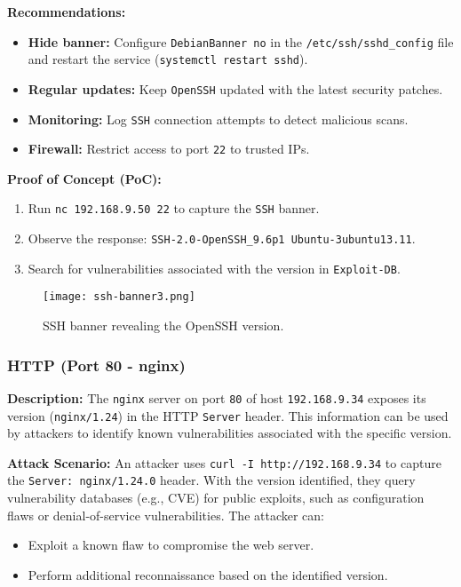\documentclass[a4paper,12pt]{article}
\begin{document}
\textbf{Recommendations:}  
\begin{itemize}
    \item \textbf{Hide banner:} Configure \texttt{DebianBanner no} in the \texttt{/etc/ssh/sshd\_config} file and restart the service (\texttt{systemctl restart sshd}).  
    \item \textbf{Regular updates:} Keep \texttt{OpenSSH} updated with the latest security patches.  
    \item \textbf{Monitoring:} Log \texttt{SSH} connection attempts to detect malicious scans.  
    \item \textbf{Firewall:} Restrict access to port \texttt{22} to trusted IPs.  
\end{itemize}

\textbf{Proof of Concept (PoC):}  
\begin{enumerate}
    \item Run \texttt{nc 192.168.9.50 22} to capture the \texttt{SSH} banner.  
    \item Observe the response: \texttt{SSH-2.0-OpenSSH\_9.6p1 Ubuntu-3ubuntu13.11}.  
    \item Search for vulnerabilities associated with the version in \texttt{Exploit-DB}.  
\end{enumerate}

\begin{figure}[ht]
    \centering
    \texttt{[image: ssh-banner3.png]}
    \caption{SSH banner revealing the OpenSSH version.}
\end{figure}

\subsubsection{HTTP (Port 80 - nginx)}
\textbf{Description:}  
The \texttt{nginx} server on port \texttt{80} of host \texttt{192.168.9.34} exposes its version (\texttt{nginx/1.24}) in the HTTP \texttt{Server} header. This information can be used by attackers to identify known vulnerabilities associated with the specific version.

\textbf{Attack Scenario:}  
An attacker uses \texttt{curl -I http://192.168.9.34} to capture the \texttt{Server: nginx/1.24.0} header. With the version identified, they query vulnerability databases (e.g., CVE) for public exploits, such as configuration flaws or denial-of-service vulnerabilities. The attacker can:  
\begin{itemize}
    \item Exploit a known flaw to compromise the web server.  
    \item Perform additional reconnaissance based on the identified version.  
\end{itemize}
\end{document}
